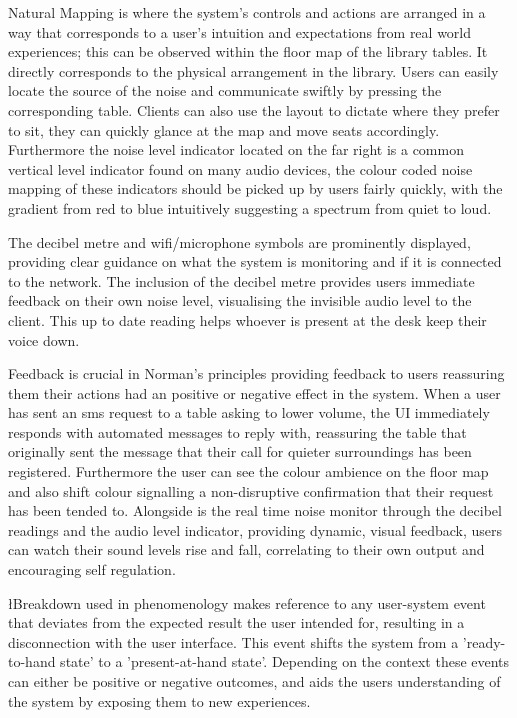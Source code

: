 \documentclass{novel}
\begin{document}
Natural Mapping is where the system's controls and actions are arranged in a way that corresponds to a user's intuition and expectations from real world experiences; this can be observed within the floor map of the library tables. It directly corresponds to the physical arrangement in the library. Users can easily locate the source of the noise and communicate swiftly by pressing the corresponding table. Clients can also use the layout to dictate where they prefer to sit, they can quickly glance at the map and move seats accordingly. Furthermore the noise level indicator located on the far right is a common vertical level indicator found on many audio devices, the colour coded noise mapping of these indicators should be picked up by users fairly quickly, with the gradient from red to blue intuitively suggesting a spectrum from quiet to loud.

\clearpage
The decibel metre and wifi/microphone symbols are prominently displayed, providing clear guidance on what the system is monitoring and if it is connected to the network. The inclusion of the decibel metre provides users immediate feedback on their own noise level, visualising the invisible audio level to the client. This up to date reading helps whoever is present at the desk keep their voice down. 

Feedback is crucial in Norman's principles providing feedback to users reassuring them their actions had an positive or negative effect in the system. When a user has sent an sms request to a table asking to lower volume, the UI immediately responds with automated messages to reply with, reassuring the table that originally sent the message that their call for quieter surroundings has been registered. Furthermore the user can see the colour ambience on the floor map and also shift colour signalling a non-disruptive confirmation that their request has been tended to. Alongside is the real time noise monitor through the decibel readings and the audio level indicator, providing dynamic, visual feedback, users can watch their sound levels rise and fall, correlating to their own output and encouraging self regulation. 

\l{B}reakdown used in phenomenology makes reference to any user-system event that deviates from the expected result the user intended for, resulting in a disconnection with the user interface. This event shifts the system from a 'ready-to-hand state' to a 'present-at-hand state'. Depending on the context these events can either be positive or negative outcomes, and aids the users understanding of the system by exposing them to new experiences.
\end{document}
